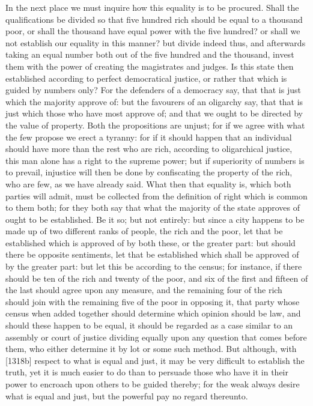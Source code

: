 In the next place we must inquire how this equality is to be procured.
Shall the qualifications be divided so that five hundred rich should be
equal to a thousand poor, or shall the thousand have equal power with the
five hundred? or shall we not establish our equality in this manner? but
divide indeed thus, and afterwards taking an equal number both out of the
five hundred and the thousand, invest them with the power of creating the
magistrates and judges. Is this state then established according to
perfect democratical justice, or rather that which is guided by numbers
only? For the defenders of a democracy say, that that is just which the
majority approve of: but the favourers of an oligarchy say, that that is
just which those who have most approve of; and that we ought to be
directed by the value of property. Both the propositions are unjust; for
if we agree with what the few propose we erect a tyranny: for if it should
happen that an individual should have more than the rest who are rich,
according to oligarchical justice, this man alone has a right to the
supreme power; but if superiority of numbers is to prevail, injustice will
then be done by confiscating the property of the rich, who are few, as we
have already said. What then that equality is, which both parties will
admit, must be collected from the definition of right which is common to
them both; for they both say that what the majority of the state approves
of ought to be established. Be it so; but not entirely: but since a city
happens to be made up of two different ranks of people, the rich and the
poor, let that be established which is approved of by both these, or the
greater part: but should there be opposite sentiments, let that be
established which shall be approved of by the greater part: but let this
be according to the census; for instance, if there should be ten of the
rich and twenty of the poor, and six of the first and fifteen of the last
should agree upon any measure, and the remaining four of the rich should
join with the remaining five of the poor in opposing it, that party whose
census when added together should determine which opinion should be law,
and should these happen to be equal, it should be regarded as a case
similar to an assembly or court of justice dividing equally upon any
question that comes before them, who either determine it by lot or some
such method. But although, with [1318b] respect to what is equal and just,
it may be very difficult to establish the truth, yet it is much easier to
do than to persuade those who have it in their power to encroach upon
others to be guided thereby; for the weak always desire what is equal and
just, but the powerful pay no regard thereunto.

